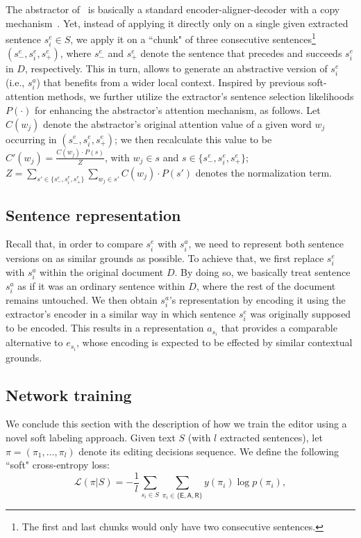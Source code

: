 \documentclass{article}
\begin{document}
The abstractor of~\cite{ChenFastAS2018} is basically a standard encoder-aligner-decoder with a copy mechanism~\cite{See2017GetTT}. Yet, instead of applying it directly only on a single given extracted sentence $s_{i}^{e}\in{S}$, we apply it on a ``chunk" of three consecutive sentences\footnote{\small The first and last chunks would only have two consecutive sentences.}  $(s_{-}^{e},s_{i}^{e},s_{+}^{e})$, where $s_{-}^{e}$ and $s_{+}^{e}$ denote the sentence that precedes and succeeds $s_{i}^{e}$ in $D$, respectively. This in turn, allows to generate an abstractive version of $s_{i}^{e}$ (i.e., $s_{i}^{a}$) that benefits from a wider local context. Inspired by previous soft-attention methods, we further utilize the extractor's sentence selection likelihoods $P(\cdot)$ for enhancing the abstractor's attention mechanism, as follows. Let $C(w_{j})$ denote the abstractor's original attention value of a given word $w_{j}$ occurring in $(s_{-}^{e},s_{i}^{e},s_{+}^{e})$; we then recalculate this value to be $C'(w_{j})=\frac{C(w_{j})\cdot P(s)}{Z}$, with $w_{j}\in{s}$ and $s\in\{s_{-}^{e},s_{i}^{e},s_{+}^{e}\}$; $Z=\sum_{s'\in\{s_{-}^{e},s_{i}^{e},s_{+}^{e}\}}\sum_{w_{j}\in{s'}}C(w_{j})\cdot P(s')$ denotes the normalization term.




\subsection{Sentence representation}
Recall that, in order to compare $s_{i}^{e}$ with $s_{i}^{a}$, we need to represent both sentence versions on as similar grounds as possible.
To achieve that, we first replace $s_{i}^{e}$ with $s_{i}^{a}$ within the original document $D$. By doing so, we basically treat sentence $s_{i}^{a}$ as if it was an ordinary sentence within $D$, where the rest of the document remains untouched. We then obtain $s_{i}^{a}$'s representation by encoding it using the extractor's encoder in a similar way in which sentence $s_{i}^{e}$ was originally supposed to be encoded.
This results in a representation $a_{s_i}$ that provides a comparable alternative to $e_{s_i}$, whose encoding is expected to be effected by similar contextual grounds.


\subsection{Network training}\label{sec:network_train}
We conclude this section with the description of how we train the editor using a novel soft labeling approach.
Given text $S$ (with $l$ extracted sentences), let $\pi=(\pi_{1},\ldots,\pi_{l})$ denote its editing decisions sequence. We define the following ``soft" cross-entropy loss:
\begin{equation}\label{eq:loss function}
  \mathcal{L}(\pi|S)=-\frac{1}{l}\sum\limits_{s_{i}\in{S}}\sum_{\pi_i\in\{\textsf{E},\textsf{A},\textsf{R}\}}y(\pi_i)\log p(\pi_i),
\end{equation}
\end{document}
